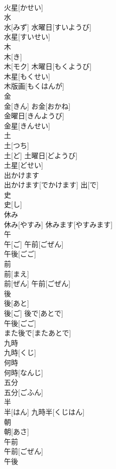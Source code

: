 \documentclass[8pt]{extreport}
\begin{document}
\begin{CJK}{UTF8}{min}
\\	火星[かせい] 
\\	水	
\\	水[みず]	水曜日[すいようび] 
\\	水星[すいせい] 
\\	木	
\\	木[き] 
\\	木[モク]	木曜日[もくようび] 
\\	木星[もくせい] 
\\	木版画[もくはんが] 
\\	金	
\\	金[きん]	お金[おかね] 
\\	金曜日[きんようび] 
\\	金星[きんせい] 
\\	土	
\\	土[つち] 
\\	土[ど]	土曜日[どようび] 
\\	土星[どせい] 
\\	出かけます	
\\	出かけます[でかけます]	出[で] 
\\	史	
\\	史[し]	
\\	休み	
\\	休み[やすみ]	休みます[やすみます] 
\\	午	
\\	午[ご]	午前[ごぜん] 
\\	午後[ごご] 
\\	前	
\\	前[まえ] 
\\	前[ぜん]	午前[ごぜん] 
\\	後	
\\	後[あと] 
\\	後[ご]	後で[あとで] 
\\	午後[ごご] 
\\	また後で[またあとで] 
\\	九時	
\\	九時[くじ]	
\\	何時	
\\	何時[なんじ]	
\\	五分	
\\	五分[ごふん]	
\\	半	
\\	半[はん]	九時半[くじはん] 
\\	朝	
\\	朝[あさ]	
\\	午前	
\\	午前[ごぜん]	
\\	午後	

\end{CJK}
\end{document}
